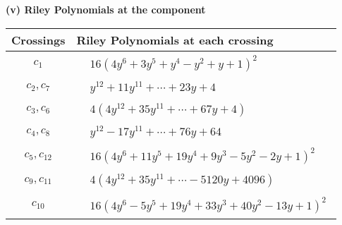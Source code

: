 \documentclass[1p]{elsarticle_modified}
\theoremstyle{definition}
\begin{document}
\newpage\renewcommand{\arraystretch}{1}
\flushleft \textbf{(v) Riley Polynomials at the component}\newline \\
\begin{tabular}{m{50pt}|m{274pt}}
Crossings & \hspace{64pt}Riley Polynomials at each crossing \\
\hline $$\begin{aligned}c_{1}\end{aligned}$$&$\begin{aligned}
&16(4 y^6+3 y^5+y^4- y^2+y+1)^2
\end{aligned}$\\
\hline $$\begin{aligned}c_{2},c_{7}\end{aligned}$$&$\begin{aligned}
&y^{12}+11 y^{11}+\cdots+23 y+4
\end{aligned}$\\
\hline $$\begin{aligned}c_{3},c_{6}\end{aligned}$$&$\begin{aligned}
&4(4 y^{12}+35 y^{11}+\cdots+67 y+4)
\end{aligned}$\\
\hline $$\begin{aligned}c_{4},c_{8}\end{aligned}$$&$\begin{aligned}
&y^{12}-17 y^{11}+\cdots+76 y+64
\end{aligned}$\\
\hline $$\begin{aligned}c_{5},c_{12}\end{aligned}$$&$\begin{aligned}
&16(4 y^6+11 y^5+19 y^4+9 y^3-5 y^2-2 y+1)^2
\end{aligned}$\\
\hline $$\begin{aligned}c_{9},c_{11}\end{aligned}$$&$\begin{aligned}
&4(4 y^{12}+35 y^{11}+\cdots-5120 y+4096)
\end{aligned}$\\
\hline $$\begin{aligned}c_{10}\end{aligned}$$&$\begin{aligned}
&16(4 y^6-5 y^5+19 y^4+33 y^3+40 y^2-13 y+1)^2
\end{aligned}$\\
\hline
\end{tabular}\\~\\
\end{document}
